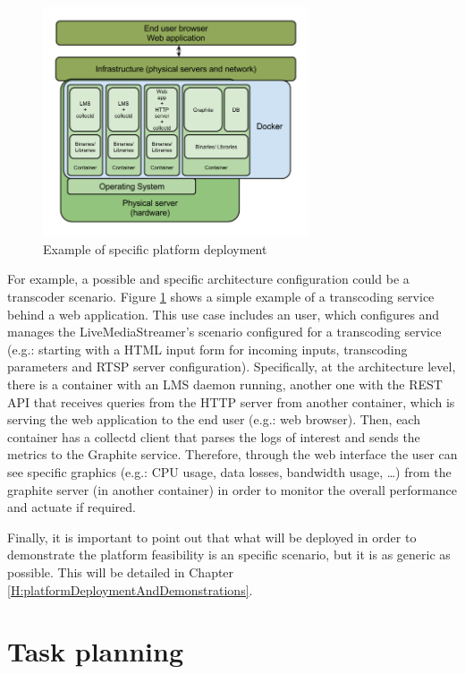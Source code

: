 \begin{figure}[!htb]
\begin{center}
\includegraphics[width=0.7\textwidth]{./images/exampleArch.png}
\caption{Example of specific platform deployment}
\label{F:exampleArch}
\end{center}
\end{figure} 

For example, a possible and specific architecture configuration could be a transcoder scenario. Figure \ref{F:exampleArch} shows a simple example of a transcoding service behind a web application. This use case includes an user, which configures and manages the LiveMediaStreamer's scenario configured for a transcoding service (e.g.: starting with a HTML input form for incoming inputs, transcoding parameters and RTSP server configuration). Specifically, at the architecture level, there is a container with an LMS daemon running, another one with the REST API that receives queries from the HTTP server from another container, which is serving the web application to the end user (e.g.: web browser). Then, each container has a collectd client that parses the logs of interest and sends the metrics to the Graphite service. Therefore, through the web interface the user can see specific graphics (e.g.: CPU usage, data losses, bandwidth usage, \ldots) from the graphite server (in another container) in order to monitor the overall performance and actuate if required.  

Finally, it is important to point out that what will be deployed in order to demonstrate the platform feasibility is an specific scenario, but it is as generic as possible. This will be detailed in Chapter \ref{H:platformDeploymentAndDemonstrations}.

\section{Task planning}

